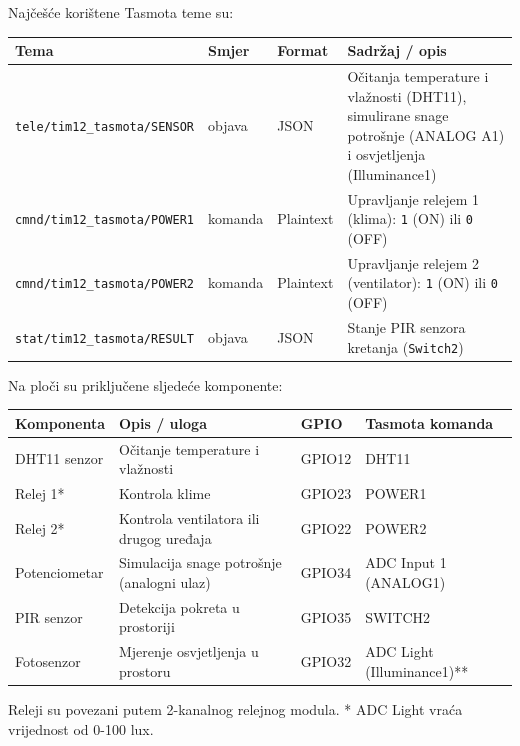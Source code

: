 \documentclass[11pt,a4paper]{article}
\begin{document}
\pagebreak
Najčešće korištene Tasmota teme su:

{\small
\begin{center}
      \begin{tabularx}{\textwidth}{@{}L{0.34\textwidth} l l X@{}}
            \toprule
            \textbf{Tema}                       & \textbf{Smjer} & \textbf{Format} & \textbf{Sadržaj / opis}                                                  \\
            \midrule
            \texttt{tele/tim12\_tasmota/SENSOR} & objava         & JSON            &
            Očitanja temperature i vlažnosti (DHT11), simulirane snage potrošnje (ANALOG A1) i osvjetljenja (Illuminance1)                                    \\
            \texttt{cmnd/tim12\_tasmota/POWER1} & komanda        & Plaintext       & Upravljanje relejem 1 (klima): \texttt{1} (ON) ili \texttt{0} (OFF)      \\
            \texttt{cmnd/tim12\_tasmota/POWER2} & komanda        & Plaintext       & Upravljanje relejem 2 (ventilator): \texttt{1} (ON) ili \texttt{0} (OFF) \\
            \texttt{stat/tim12\_tasmota/RESULT} & objava         & JSON            & Stanje PIR senzora kretanja (\texttt{Switch2})                           \\
            \bottomrule
      \end{tabularx}
\end{center}
}

Na ploči su priključene sljedeće komponente:

{\small
\begin{center}
      \begin{tabularx}{\textwidth}{@{}L{0.20\textwidth} X l l@{}}
            \toprule
            \textbf{Komponenta} & \textbf{Opis / uloga}                      & \textbf{GPIO} & \textbf{Tasmota komanda}   \\
            \midrule
            DHT11 senzor        & Očitanje temperature i vlažnosti           & GPIO12        & DHT11                      \\
            Relej 1*            & Kontrola klime                             & GPIO23        & POWER1                     \\
            Relej 2*            & Kontrola ventilatora ili drugog uređaja    & GPIO22        & POWER2                     \\
            Potenciometar       & Simulacija snage potrošnje (analogni ulaz) & GPIO34        & ADC Input 1 (ANALOG1)      \\
            PIR senzor          & Detekcija pokreta u prostoriji             & GPIO35        & SWITCH2                    \\
            Fotosenzor          & Mjerenje osvjetljenja u prostoru           & GPIO32        & ADC Light (Illuminance1)** \\
            \bottomrule
      \end{tabularx}

      {\footnotesize * Releji su povezani putem 2-kanalnog relejnog modula.}
      {\footnotesize ** ADC Light vraća vrijednost od 0-100 lux.}
\end{center}
}
\end{document}
